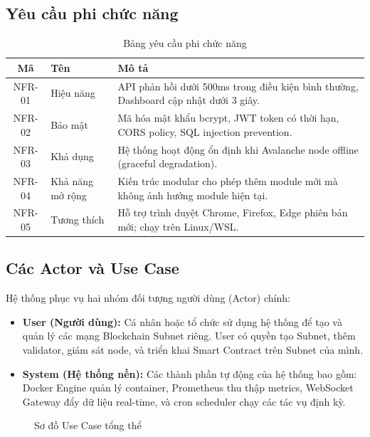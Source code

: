 \subsection{Yêu cầu phi chức năng}

\begin{table}[H]
\centering
\caption{Bảng yêu cầu phi chức năng}
\label{tab:nonfunctional_requirements}
\begin{tabular}{|c|p{3cm}|p{8cm}|}
\hline
\textbf{Mã} & \textbf{Tên} & \textbf{Mô tả} \\ \hline
NFR-01 & Hiệu năng & API phản hồi dưới 500ms trong điều kiện bình thường, Dashboard cập nhật dưới 3 giây. \\ \hline
NFR-02 & Bảo mật & Mã hóa mật khẩu bcrypt, JWT token có thời hạn, CORS policy, SQL injection prevention. \\ \hline
NFR-03 & Khả dụng & Hệ thống hoạt động ổn định khi Avalanche node offline (graceful degradation). \\ \hline
NFR-04 & Khả năng mở rộng & Kiến trúc modular cho phép thêm module mới mà không ảnh hưởng module hiện tại. \\ \hline
NFR-05 & Tương thích & Hỗ trợ trình duyệt Chrome, Firefox, Edge phiên bản mới; chạy trên Linux/WSL. \\ \hline
\end{tabular}
\end{table}

\subsection{Các Actor và Use Case}

Hệ thống phục vụ hai nhóm đối tượng người dùng (Actor) chính:

\begin{itemize}
    \item \textbf{User (Người dùng):} Cá nhân hoặc tổ chức sử dụng hệ thống để tạo và quản lý các mạng Blockchain Subnet riêng. User có quyền tạo Subnet, thêm validator, giám sát node, và triển khai Smart Contract trên Subnet của mình.

    \item \textbf{System (Hệ thống nền):} Các thành phần tự động của hệ thống bao gồm: Docker Engine quản lý container, Prometheus thu thập metrics, WebSocket Gateway đẩy dữ liệu real-time, và cron scheduler chạy các tác vụ định kỳ.
\end{itemize}

\begin{figure}[H]
\centering
{}
\caption{Sơ đồ Use Case tổng thể}
\label{fig:usecase}
\end{figure}

